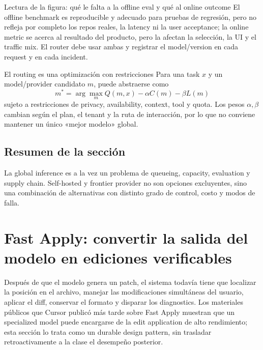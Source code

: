 \documentclass[a4paper]{article}
\begin{document}
\begin{knowledgebox}{Lectura de la figura: qué le falta a la offline eval y qué al online outcome}
El offline benchmark es reproducible y adecuado para pruebas de regresión, pero no refleja por completo los repos reales, la latency ni la user acceptance; la online metric se acerca al resultado del producto, pero la afectan la selección, la UI y el traffic mix. El router debe usar ambas y registrar el model/version en cada request y en cada incident.
\end{knowledgebox}

\begin{importantbox}{El routing es una optimización con restricciones}
Para una task $x$ y un model/provider candidato $m$, puede abstraerse como
\[
m^*=\arg\max_m Q(m,x)-\alpha C(m)-\beta L(m)
\]
sujeto a restricciones de privacy, availability, context, tool y quota. Los pesos $\alpha,\beta$ cambian según el plan, el tenant y la ruta de interacción, por lo que no conviene mantener un único «mejor modelo» global.
\end{importantbox}


\subsection{Resumen de la sección}

La global inference es a la vez un problema de queueing, capacity, evaluation y supply chain. Self-hosted y frontier provider no son opciones excluyentes, sino una combinación de alternativas con distinto grado de control, costo y modos de falla.
\section{Fast Apply: convertir la salida del modelo en ediciones verificables}

Después de que el modelo genera un patch, el sistema todavía tiene que localizar la posición en el archivo, manejar las modificaciones simultáneas del usuario, aplicar el diff, conservar el formato y disparar los diagnostics. Los materiales públicos que Cursor publicó más tarde sobre Fast Apply muestran que un specialized model puede encargarse de la edit application de alto rendimiento; esta sección lo trata como un durable design pattern, sin trasladar retroactivamente a la clase el desempeño posterior.
\end{document}
